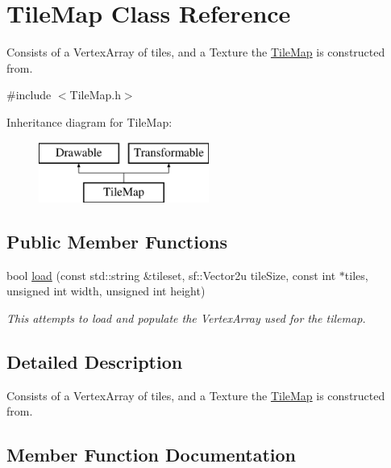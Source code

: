\hypertarget{class_tile_map}{}\section{Tile\+Map Class Reference}
\label{class_tile_map}


Consists of a Vertex\+Array of tiles, and a Texture the \hyperlink{class_tile_map}{Tile\+Map} is constructed from.  




{\ttfamily \#include $<$Tile\+Map.\+h$>$}

Inheritance diagram for Tile\+Map\+:\begin{figure}[H]
\begin{center}
\leavevmode
\includegraphics[height=2.000000cm]{class_tile_map}
\end{center}
\end{figure}
\subsection*{Public Member Functions}
\begin{DoxyCompactItemize}
\item 
bool \hyperlink{class_tile_map_a5bc3325e2382599c3f986ac64481e832}{load} (const std\+::string \&tileset, sf\+::\+Vector2u tile\+Size, const int $\ast$tiles, unsigned int width, unsigned int height)
\begin{DoxyCompactList}\small\item\em This attempts to load and populate the Vertex\+Array used for the tilemap. \end{DoxyCompactList}\end{DoxyCompactItemize}


\subsection{Detailed Description}
Consists of a Vertex\+Array of tiles, and a Texture the \hyperlink{class_tile_map}{Tile\+Map} is constructed from. 

\subsection{Member Function Documentation}
\mbox{\label{class_tile_map_a5bc3325e2382599c3f986ac64481e832}} 
